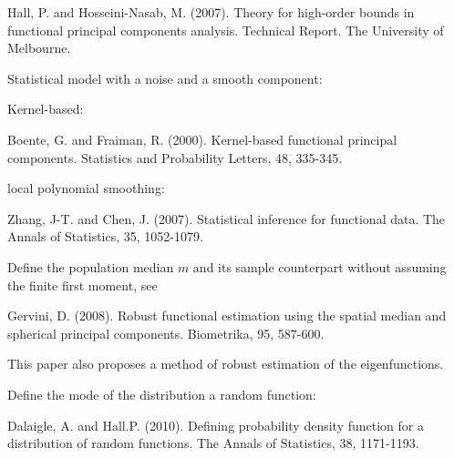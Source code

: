 Hall, P. and Hosseini-Nasab, M. (2007). Theory for high-order bounds in functional principal components analysis. Technical Report. The University of Melbourne.

Statistical model with a noise and a smooth component:

Kernel-based:

Boente, G. and Fraiman, R. (2000). Kernel-based functional principal components. Statistics and Probability Letters, 48, 335-345.

local polynomial smoothing:

Zhang, J-T. and Chen, J. (2007). Statistical inference for functional data. The Annals of Statistics, 35, 1052-1079.

Define the population median $m$ and its sample counterpart without assuming the finite first moment, see

Gervini, D. (2008). Robust functional estimation using the spatial median and spherical principal components. Biometrika, 95, 587-600.

This paper also proposes a method of robust estimation of the eigenfunctions.

Define the mode of the distribution a random function:

Dalaigle, A. and Hall.P. (2010). Defining probability density function for a distribution of random functions. The Annals of Statistics, 38, 1171-1193.
